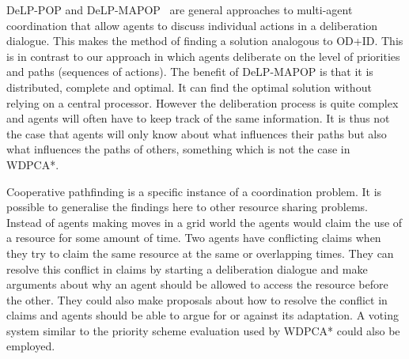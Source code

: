 \textsf{DeLP-POP} and \textsf{DeLP-MAPOP}~\cite{pardo2011,ferrando2012} are 
general approaches to multi-agent coordination that allow agents to discuss 
individual actions in a deliberation dialogue. This makes the method of finding 
a solution analogous to OD+ID. This is in contrast to our approach in which 
agents deliberate on the level of priorities and paths (sequences of actions). 
The benefit of \textsf{DeLP-MAPOP} is that it is distributed, complete and 
optimal. It can find the optimal solution without relying on a central 
processor. However the deliberation process is quite complex and agents will 
often have to keep track of the same information. It is thus not the case that 
agents will only know about what influences their paths but also what 
influences the paths of others, something which is not the case in WDPCA*.





Cooperative pathfinding is a specific instance of a coordination problem. It is
possible to generalise the findings here to other resource sharing problems.
Instead of agents making moves in a grid world the agents would claim the use
of a resource for some amount of time. Two agents have conflicting claims when
they try to claim the same resource at the same or overlapping times. They can
resolve this conflict in claims by starting a deliberation dialogue and make
arguments about why an agent should be allowed to access the resource before
the other. They could also make proposals about how to resolve the conflict in
claims and agents should be able to argue for or against its adaptation. A
voting system similar to the priority scheme evaluation used by WDPCA* could
also be employed.


